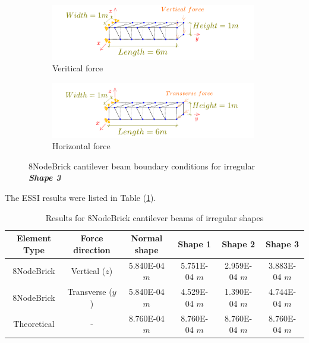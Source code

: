 \documentclass[fleqn,11pt,letter]{article}
\begin{document}
\begin{figure}[H]
  \centering
    \begin{subfigure}{0.5\textwidth}
      \centering
      \includegraphics[width=9cm]{../Figure_files/8NodeBrick/beam_brick_shape3_vertical.pdf}
      \caption{Veritical force}
    \end{subfigure}
    \begin{subfigure}{0.5\textwidth}
      \centering
      \includegraphics[width=9cm]{../Figure_files/8NodeBrick/beam_brick_shape3_horizontal.pdf}
      \caption{Horizontal force}
    \end{subfigure}
  \caption{8NodeBrick cantilever beam boundary conditions for irregular \textbf{\emph{Shape 3}} }
  \label{fig 8NodeBrick cantilever beam boundary conditions shape 3}
\end{figure}


The ESSI results were listed in Table (\ref{table Results for 8NodeBrick cantilever beams of irregular shapes}). 
\begin{table}[H]
  \centering
  \caption{Results for 8NodeBrick cantilever beams of irregular shapes}
  \label{table Results for 8NodeBrick cantilever beams of irregular shapes}
  \begin{tabular}{|c|c|c|c|c|c|}
    \hline 
    Element Type   & Force direction & Normal shape & Shape 1 & Shape 2 & Shape 3  \\ \hline 
    8NodeBrick     & Vertical ($z$)     & 5.840E-04 $m$  & 5.751E-04 $m$ & 2.959E-04 $m$ & 3.883E-04 $m$   \\ \hline
    8NodeBrick     & Transverse ($y$)      & 5.840E-04 $m$  & 4.529E-04 $m$ & 1.390E-04 $m$ & 4.744E-04 $m$   \\ \hline
    Theoretical    &      -              & 8.760E-04 $m$  & 8.760E-04 $m$ & 8.760E-04 $m$ & 8.760E-04 $m$ \\ \hline
  \end{tabular}
\end{table}
\end{document}
